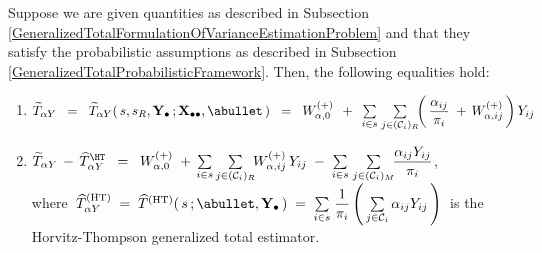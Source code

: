 \begin{lemma}
\label{GeneralizedTotalImputationError}
\mbox{}
\vskip 0.1cm
\noindent
Suppose we are given quantities as described in Subsection
\ref{GeneralizedTotalFormulationOfVarianceEstimationProblem}
and
that they satisfy the probabilistic assumptions as described in Subsection
\ref{GeneralizedTotalProbabilisticFramework}.
\vskip 0.1cm
\noindent
Then, the following equalities hold:
\renewcommand{\theenumi}{\roman{enumi}}
\renewcommand{\labelenumi}{\mbox{}\;\;\,(\theenumi)$\quad$}
\begin{enumerate}
\item
    $
    \widetilde{T}_{\alpha Y}
    \;\; = \;\;
        \widetilde{T}_{\alpha Y}(\,s,s_{R},\Ydot\,;\Xobs,\abullet\,)
    \;\; = \;\;
        W^{(+)}_{\alpha,0}
        \;\, + \;\,
        \underset{i \in {\color{black}s}}{\sum}\;
        \underset{j \in (\mathcal{C}_{i})_{R}}{\sum}\!\!
        \left(\,
            \dfrac{
                \alpha_{ij}
                }{
                \pi_{i}
                }
            \; + \,
            W^{(+)}_{\alpha,ij}
            \,\right)
        Y_{ij}
    $
\item
    $
    \widetilde{T}_{\alpha Y}
    \, - \,
    \widehat{T}^{\HT}_{\alpha Y}
    \;\; = \;\;
        W^{(+)}_{\alpha,0}
        \; + \,
        \underset{i \in {\color{black}s}}{\sum}\,
        \underset{j \in (\mathcal{C}_{i})_{R}}{\sum}\!
        W^{(+)}_{\alpha,ij}\,Y_{ij}
        \; - \;
        \underset{i \in {\color{black}s}}{\sum}\;
        \underset{j \in (\mathcal{C}_{i})_{M}}{\sum}\!
        \dfrac{ \alpha_{ij}Y_{ij} }{ \pi_{i} }
    $,\\
    where
    \,$
    \widehat{T}^{\textnormal{(HT)}}_{\alpha Y}
    \; = \;
    \widehat{T}^{\textnormal{(HT)}}(\,s\,;\abullet,\Ydot\,)
    \; = \;
        \underset{i \in s}{\sum}\;
        \dfrac{1}{\pi_{i}}
        \left(\,
            \underset{j \in \mathcal{C}_{i}}{\sum}\,\alpha_{ij}Y_{ij}
            \,\right)
    $\,
    is the Horvitz-Thompson generalized total estimator.
\end{enumerate}
\end{lemma}
\proof
